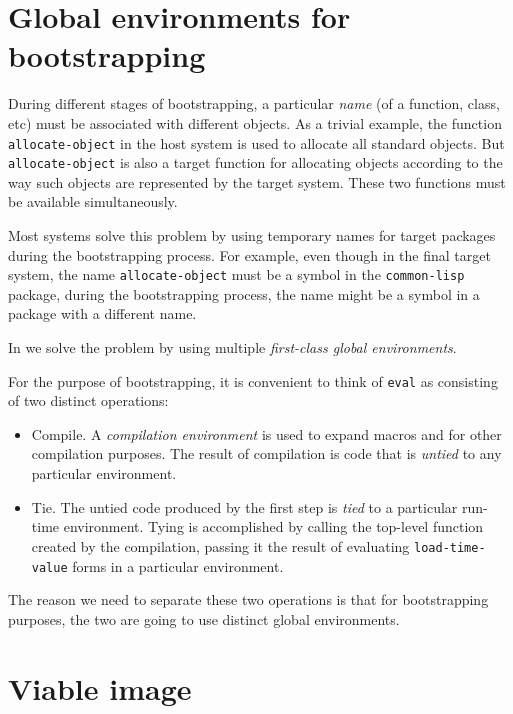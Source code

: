 \section{Global environments for bootstrapping}

During different stages of bootstrapping, a particular \emph{name} (of
a function, class, etc) must be associated with different objects.  As
a trivial example, the function \texttt{allocate-object} in the host
system is used to allocate all standard objects.  But
\texttt{allocate-object} is also a target function for allocating
objects according to the way such objects are represented by the
target system.  These two functions must be available simultaneously.

Most systems solve this problem by using temporary names for target
packages during the bootstrapping process.  For example, even though
in the final target system, the name \texttt{allocate-object} must be
a symbol in the \texttt{common-lisp} package, during the bootstrapping
process, the name might be a symbol in a package with a different
name.

In \sysname{} we solve the problem by using multiple \emph{first-class
  global environments}.

For the purpose of bootstrapping, it is convenient to think of
\texttt{eval} as consisting of two distinct operations:

\begin{itemize}
\item Compile.  A \emph{compilation environment} is used to expand
  macros and for other compilation purposes.  The result of
  compilation is code that is \emph{untied} to any particular
  environment.
\item Tie.  The untied code produced by the first step is \emph{tied}
  to a particular run-time environment.  Tying is accomplished by
  calling the top-level function created by the compilation, passing
  it the result of evaluating \texttt{load-time-value} forms in a
  particular environment.
\end{itemize}

The reason we need to separate these two operations is that for
bootstrapping purposes, the two are going to use distinct global
environments.

\section{Viable image}
\label{sec-bootstrapping-viable-image}

